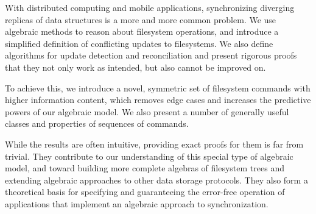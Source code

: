 
With distributed computing and mobile applications,
synchronizing diverging replicas of data structures is a more and more common problem.
We use algebraic methods to reason about filesystem operations, 
and introduce a simplified definition of conflicting updates to filesystems.
We also define algorithms for update detection and reconciliation
and present rigorous proofs that they not only work as intended,
but also cannot be improved on.

To achieve this, we introduce a novel, symmetric set of filesystem commands
with higher information content,
which removes edge cases
and increases the predictive powers of our algebraic model.
We also present a number of generally useful classes and properties
of sequences of commands.

While the results are often intuitive,
providing exact proofs for them is far from trivial.
They contribute to our understanding of this special type of algebraic model,
and toward building more complete algebras
of filesystem trees 
and extending algebraic approaches to other data storage protocols.
They also form a theoretical basis for
specifying
and guaranteeing the error-free operation
of applications that implement an algebraic approach to synchronization.

